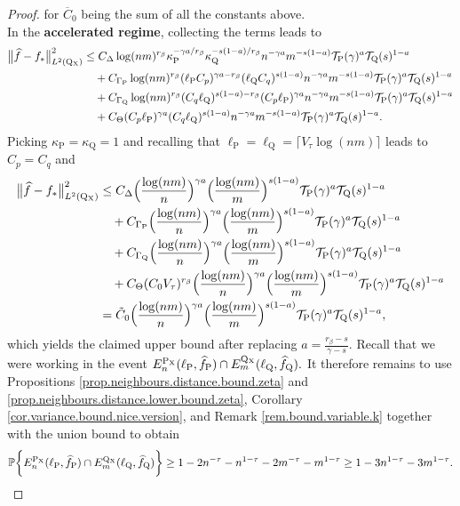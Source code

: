 \documentclass[10pt]{article}
\newcommand{\mT}{\mathcal{T}}
\newcommand{\PP}{\mathbb{P}}
\renewcommand{\P}{\operatorname{P}}
\newcommand{\Q}{\operatorname{Q}}
\renewcommand{\k}{\kappa}
\newcommand{\wh}{\widehat}
\newcommand{\ol}{\overline}
\newcommand{\sX}{\mathrm{X}}
\begin{document}
\begin{proof}
    for $\ol C_0$ being the sum of all the constants above.\\
    \noindent In the \textbf{accelerated regime}, collecting the terms leads to
    \begin{align*}
        \big\|\wh f - f_*\big\|_{L^2(\Q\mathstrut_{\!\sX})}^2 &\leq C_{\Delta}\log(nm)^{r_\beta}\k_{\P}^{-\gamma a/r_{\beta}}\k_{\Q}^{-s(1 - a)/r_\beta}n^{-\gamma a}m^{-s(1- a)}\mT_{\P}(\gamma)^{a} \mT_{\Q}(s)^{1 - a}\\
        &\quad + C_{\Gamma_{\P}}\log(nm)^{r_\beta}(\ell_{\P}C_{p})^{\gamma a - r_\beta}(\ell_{\Q}C_q)^{s(1 - a)}n^{-\gamma a}m^{-s(1 - a)}\mT_{\P}(\gamma)^{a}\mT_{\Q}(s)^{1-a}\\
        &\quad + C_{\Gamma_{\Q}}\log(nm)^{r_\beta}(C_q\ell_{\Q})^{s(1 - a) - r_\beta}(C_p\ell_{\P})^{\gamma a}n^{-\gamma a}m^{-s(1 - a)}\mT_{\P}(\gamma)^{a}\mT_{\Q}(s)^{1 - a}\\
        &\quad + C_{\Theta}(C_p\ell_{\P})^{\gamma a}(C_q\ell_{\Q})^{s(1 - a)}n^{-\gamma a}m^{-s(1 - a)}\mT_{\P}(\gamma)^{a}\mT_{\Q}(s)^{1-a}.
    \end{align*}
    Picking $\k_{\P} = \k_{\Q} = 1$ and recalling that $\ell_{\P} = \ell_{\Q} = \lceil V_\tau \log(nm)\rceil$ leads to $C_p = C_q$ and
    \begin{align*}
        \big\|\wh f - f_*\big\|_{L^2(\Q\mathstrut_{\!\sX})}^2 &\leq C_{\Delta}\Big(\frac{\log(nm)}{n}\Big)^{\gamma a}\Big(\frac{\log(nm)}{m}\Big)^{s(1- a)}\mT_{\P}(\gamma)^{a} \mT_{\Q}(s)^{1 - a}\\
        &\quad + C_{\Gamma_{\P}}\Big(\frac{\log(nm)}{n}\Big)^{\gamma a}\Big(\frac{\log(nm)}{m}\Big)^{s(1- a)}\mT_{\P}(\gamma)^{a}\mT_{\Q}(s)^{1-a}\\
        &\quad + C_{\Gamma_{\Q}}\Big(\frac{\log(nm)}{n}\Big)^{\gamma a}\Big(\frac{\log(nm)}{m}\Big)^{s(1- a)}\mT_{\P}(\gamma)^{a}\mT_{\Q}(s)^{1 - a}\\
        &\quad + C_{\Theta}(C_0V_\tau)^{r_\beta}\Big(\frac{\log(nm)}{n}\Big)^{\gamma a}\Big(\frac{\log(nm)}{m}\Big)^{s(1- a)}\mT_{\P}(\gamma)^{a}\mT_{\Q}(s)^{1-a}\\
        &= \tilde C_0\Big(\frac{\log(nm)}{n}\Big)^{\gamma a}\Big(\frac{\log(nm)}{m}\Big)^{s(1- a)}\mT_{\P}(\gamma)^{a}\mT_{\Q}(s)^{1-a},
    \end{align*}
    which yields the claimed upper bound after replacing $a = \tfrac{r_\beta - s}{\gamma - s}.$ Recall that we were working in the event $E_n^{\P_{\sX}}(\ell_{\P}, \wh f_{\P}) \cap E_m^{\Q\mathstrut_{\!\sX}}(\ell_{\Q}, \wh f_{\Q}).$ It therefore remains to use Propositions \ref{prop.neighbours.distance.bound.zeta} and \ref{prop.neighbours.distance.lower.bound.zeta}, Corollary \ref{cor.variance.bound.nice.version}, and Remark \ref{rem.bound.variable.k} together with the union bound to obtain
    \begin{align*}
        \PP\bigg\{E_n^{\P_{\sX}}(\ell_{\P}, \wh f_{\P}) \cap E_m^{\Q\mathstrut_{\!\sX}}(\ell_{\Q}, \wh f_{\Q})\bigg\} \geq 1 - 2n^{-\tau} - n^{1-\tau} - 2m^{-\tau} - m^{1-\tau} \geq 1 - 3n^{1-\tau} - 3m^{1-\tau}.
    \end{align*}
\end{proof}
\end{document}
